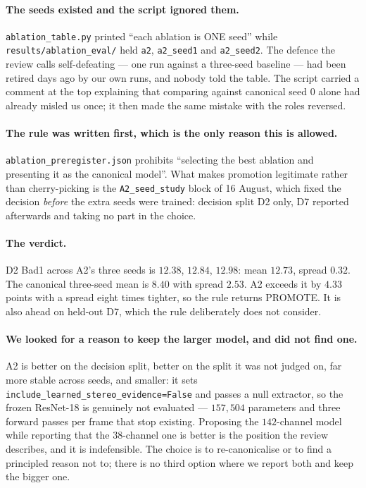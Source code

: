 \documentclass[11pt,a4paper]{article}
\begin{document}
\paragraph{The seeds existed and the script ignored them.}
\texttt{ablation\_table.py} printed ``each ablation is ONE seed'' while
\texttt{results/ablation\_eval/} held \texttt{a2}, \texttt{a2\_seed1} and
\texttt{a2\_seed2}. The defence the review calls self-defeating --- one run
against a three-seed baseline --- had been retired days ago by our own runs, and
nobody told the table. The script carried a comment at the top explaining that
comparing against canonical seed 0 alone had already misled us once; it then
made the same mistake with the roles reversed.

\paragraph{The rule was written first, which is the only reason this is allowed.}
\texttt{ablation\_preregister.json} prohibits ``selecting the best ablation and
presenting it as the canonical model''. What makes promotion legitimate rather
than cherry-picking is the \texttt{A2\_seed\_study} block of 16 August, which
fixed the decision \emph{before} the extra seeds were trained: decision split D2
only, D7 reported afterwards and taking no part in the choice.

\paragraph{The verdict.} D2 Bad1 across A2's three seeds is $12.38$, $12.84$,
$12.98$: mean $12.73$, spread $0.32$. The canonical three-seed mean is $8.40$
with spread $2.53$. A2 exceeds it by $4.33$ points with a spread eight times
tighter, so the rule returns PROMOTE. It is also ahead on held-out D7, which the
rule deliberately does not consider.

\paragraph{We looked for a reason to keep the larger model, and did not find one.}
A2 is better on the decision split, better on the split it was not judged on,
far more stable across seeds, and smaller: it sets
\texttt{include\_learned\_stereo\_evidence=False} and passes a null extractor, so
the frozen ResNet-18 is genuinely not evaluated --- $157{,}504$ parameters and
three forward passes per frame that stop existing. Proposing the $142$-channel
model while reporting that the $38$-channel one is better is the position the
review describes, and it is indefensible. The choice is to re-canonicalise or to
find a principled reason not to; there is no third option where we report both
and keep the bigger one.
\end{document}
